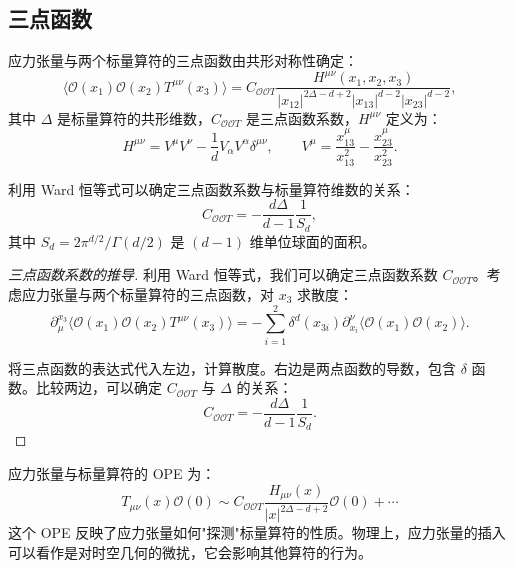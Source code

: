 \subsection{三点函数}

\begin{theorem}[应力张量的三点函数]
应力张量与两个标量算符的三点函数由共形对称性确定：
\begin{equation}
    \langle \mathcal{O}(x_1) \mathcal{O}(x_2) T^{\mu\nu}(x_3) \rangle = C_{\mathcal{O}\mathcal{O}T} \frac{H^{\mu\nu}(x_1, x_2, x_3)}{|x_{12}|^{2\Delta - d + 2} |x_{13}|^{d-2} |x_{23}|^{d-2}},
\end{equation}
其中 $\Delta$ 是标量算符的共形维数，$C_{\mathcal{O}\mathcal{O}T}$ 是三点函数系数，$H^{\mu\nu}$ 定义为：
\begin{equation}
    H^{\mu\nu} = V^\mu V^\nu - \frac{1}{d} V_\alpha V^\alpha \delta^{\mu\nu}, \qquad V^\mu = \frac{x_{13}^\mu}{x_{13}^2} - \frac{x_{23}^\mu}{x_{23}^2}.
\end{equation}

利用 Ward 恒等式可以确定三点函数系数与标量算符维数的关系：
\begin{equation}
    C_{\mathcal{O}\mathcal{O}T} = -\frac{d\Delta}{d-1} \frac{1}{S_d},
\end{equation}
其中 $S_d = 2\pi^{d/2} / \Gamma(d/2)$ 是 $(d-1)$ 维单位球面的面积。
\end{theorem}

\begin{proof}[三点函数系数的推导]
利用 Ward 恒等式，我们可以确定三点函数系数 $C_{\mathcal{O}\mathcal{O}T}$。考虑应力张量与两个标量算符的三点函数，对 $x_3$ 求散度：
\begin{equation}
    \partial_\mu^{x_3} \langle \mathcal{O}(x_1) \mathcal{O}(x_2) T^{\mu\nu}(x_3) \rangle = -\sum_{i=1}^2 \delta^d(x_{3i}) \partial^\nu_{x_i} \langle \mathcal{O}(x_1) \mathcal{O}(x_2) \rangle.
\end{equation}

将三点函数的表达式代入左边，计算散度。右边是两点函数的导数，包含 $\delta$ 函数。比较两边，可以确定 $C_{\mathcal{O}\mathcal{O}T}$ 与 $\Delta$ 的关系：
\begin{equation}
    C_{\mathcal{O}\mathcal{O}T} = -\frac{d\Delta}{d-1} \frac{1}{S_d}.
\end{equation}
\end{proof}

\begin{note}[OPE 结构]
应力张量与标量算符的 OPE 为：
\begin{equation}
    T_{\mu\nu}(x) \mathcal{O}(0) \sim C_{\mathcal{O}\mathcal{O}T} \frac{H_{\mu\nu}(x)}{|x|^{2\Delta - d + 2}} \mathcal{O}(0) + \cdots
\end{equation}
这个 OPE 反映了应力张量如何"探测"标量算符的性质。物理上，应力张量的插入可以看作是对时空几何的微扰，它会影响其他算符的行为。
\end{note}

